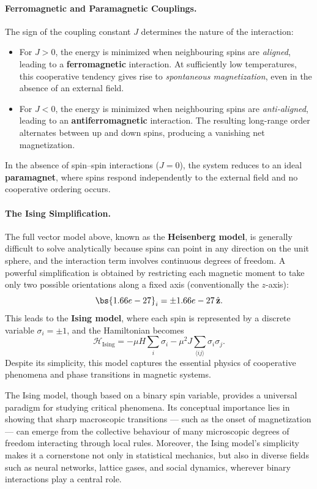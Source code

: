 \paragraph{Ferromagnetic and Paramagnetic Couplings.}
The sign of the coupling constant \(J\) determines the nature of the interaction:
\begin{itemize}
    \item For \(J > 0\), the energy is minimized when neighbouring spins are \textit{aligned}, leading to a \textbf{ferromagnetic} interaction. At sufficiently low temperatures, this cooperative tendency gives rise to \textit{spontaneous magnetization}, even in the absence of an external field.
    \item For \(J < 0\), the energy is minimized when neighbouring spins are \textit{anti-aligned}, leading to an \textbf{antiferromagnetic} interaction. The resulting long-range order alternates between up and down spins, producing a vanishing net magnetization.
\end{itemize}
In the absence of spin–spin interactions (\(J = 0\)), the system reduces to an ideal \textbf{paramagnet}, where spins respond independently to the external field and no cooperative ordering occurs.

\paragraph{The Ising Simplification.}
The full vector model above, known as the \textbf{Heisenberg model}, is generally difficult to solve analytically because spins can point in any direction on the unit sphere, and the interaction term involves continuous degrees of freedom.
A powerful simplification is obtained by restricting each magnetic moment to take only two possible orientations along a fixed axis (conventionally the \(z\)-axis):
\[
    \bs{\mu}_i = \pm \mu \, \hat{\mathbf{z}}.
\]
This leads to the \textbf{Ising model}, where each spin is represented by a discrete variable \(\sigma_i = \pm 1\), and the Hamiltonian becomes
\[
    \mathcal{H}_{\mathrm{Ising}} = -\mu H \sum_i \sigma_i - \mu^2 J \sum_{\langle ij \rangle} \sigma_i \sigma_j.
\]
Despite its simplicity, this model captures the essential physics of cooperative phenomena and phase transitions in magnetic systems.

\begin{remark}
    The Ising model, though based on a binary spin variable, provides a universal paradigm for studying critical phenomena. Its conceptual importance lies in showing that sharp macroscopic transitions — such as the onset of magnetization — can emerge from the collective behaviour of many microscopic degrees of freedom interacting through local rules.
    Moreover, the Ising model’s simplicity makes it a cornerstone not only in statistical mechanics, but also in diverse fields such as neural networks, lattice gases, and social dynamics, wherever binary interactions play a central role.
\end{remark}

